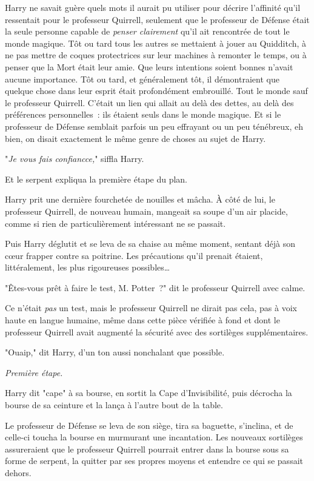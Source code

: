 Harry ne savait guère quels mots il aurait pu utiliser pour décrire l'affinité qu'il ressentait pour le professeur Quirrell, seulement que le professeur de Défense était la seule personne capable de \emph{penser clairement} qu'il ait rencontrée de tout le monde magique. Tôt ou tard tous les autres se mettaient à jouer au Quidditch, à ne pas mettre de coques protectrices sur leur machines à remonter le temps, ou à penser que la Mort était leur amie. Que leurs intentions soient bonnes n'avait aucune importance. Tôt ou tard, et généralement tôt, il démontraient que quelque chose dans leur esprit était profondément embrouillé. Tout le monde sauf le professeur Quirrell. C'était un lien qui allait au delà des dettes, au delà des préférences personnelles~: ils étaient seuls dans le monde magique. Et si le professeur de Défense semblait parfois un peu effrayant ou un peu ténébreux, eh bien, on disait exactement le même genre de choses au sujet de Harry.

"\emph{Je vous fais confiancce,}" siffla Harry.

Et le serpent expliqua la première étape du plan.

\later

Harry prit une dernière fourchetée de nouilles et mâcha. À côté de lui, le professeur Quirrell, de nouveau humain, mangeait sa soupe d'un air placide, comme si rien de particulièrement intéressant ne se passait.

Puis Harry déglutit et se leva de sa chaise au même moment, sentant déjà son cœur frapper contre sa poitrine. Les précautions qu'il prenait étaient, littéralement, les plus rigoureuses possibles…

"Êtes-vous prêt à faire le test, M. Potter~?" dit le professeur Quirrell avec calme.

Ce n'était \emph{pas} un test, mais le professeur Quirrell ne dirait pas cela, pas à voix haute en langue humaine, même dans cette pièce vérifiée à fond et dont le professeur Quirrell avait augmenté la sécurité avec des sortilèges supplémentaires.

"Ouaip," dit Harry, d'un ton aussi nonchalant que possible.

\emph{Première étape.}

Harry dit "cape" à sa bourse, en sortit la Cape d'Invisibilité, puis décrocha la bourse de sa ceinture et la lança à l'autre bout de la table.

Le professeur de Défense se leva de son siège, tira sa baguette, s'inclina, et de celle-ci toucha la bourse en murmurant une incantation. Les nouveaux sortilèges assureraient que le professeur Quirrell pourrait entrer dans la bourse sous sa forme de serpent, la quitter par ses propres moyens et entendre ce qui se passait dehors.

